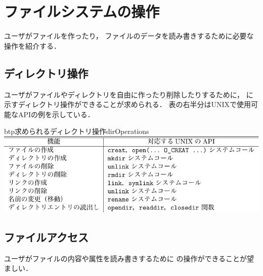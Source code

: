 \section{ファイルシステムの操作}
ユーザがファイルを作ったり，
ファイルのデータを読み書きするために必要な操作を紹介する．

\subsection{ディレクトリ操作}
ユーザがファイルやディレクトリを自由に作ったり削除したりするために，
に示すディレクトリ操作ができることが求められる．
表の右半分はUNIXで使用可能なAPIの例を示している．

\begin{mytable}{btp}{求められるディレクトリ操作}{dirOperations}
  \includegraphics[scale=1.0]{Tbl/dirOperations.pdf}
\end{mytable}

\subsection{ファイルアクセス}
ユーザがファイルの内容や属性を読み書きするために
の操作ができることが望ましい．

